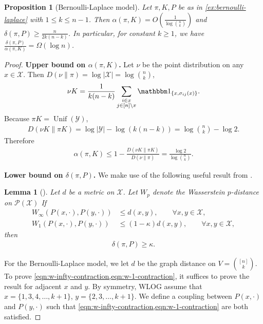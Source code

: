 \documentclass[11pt]{article}
\def\cP{\mathcal{P}}
\def\cX{\mathcal{X}}
\def\cY{\mathcal{Y}}
\DeclareMathOperator\Unif{\mathrm{Unif}}
\newtheorem{lemma}[theorem]{Lemma}
\newtheorem{proposition}[theorem]{Proposition}
\theoremstyle{definition}
\begin{document}
\begin{proposition}[Bernoulli-Laplace model] \label{prop:bernoulli-laplace}
  Let $\pi, K, P$ be as in \cref{ex:bernoulli-laplace} with $1\le k\le n-1$.
  Then $\alpha(\pi, K) = O\left(\frac 1{\log \binom nk}\right)$ and $\delta(\pi, P) \ge \frac{n}{2k(n-k)}$.
  In particular, for constant $k\ge 1$, we have $\frac{\delta(\pi, P)}{\alpha(\pi, K)} = \Omega(\log n)$.
\end{proposition}
\begin{proof}
  \textbf{Upper bound on $\alpha(\pi, K)$.}
  Let $\nu$ be the point distribution on any $x\in \cX$.
  Then $D(\nu \| \pi) = \log |\cX| = \log \binom nk$,
  \begin{align}
    \nu K =\frac 1{k(n-k)} \sum_{\substack{i\in x \\ j\in [n]\backslash x}} \mathbbm 1_{\{x,\sigma_{ij}(x)\}}.
  \end{align}
  Because $\pi K = \Unif(\cY)$,
  \begin{align}
    D(\nu K \| \pi K) = \log |\cY| - \log (k(n-k)) = \log \binom nk - \log 2.
  \end{align}
  Therefore
  \begin{align} \label{eqn:bernoulli-laplace-alpha-upper-bound}
    \alpha(\pi, K) \le 1-\frac{D(\nu K \| \pi K)}{D(\nu \| \pi)} = \frac{\log 2}{\log \binom nk}.
  \end{align}

  \textbf{Lower bound on $\delta(\pi, P)$.}
  We make use of the following useful result from \cite{caputo2024entropy}.
  \begin{lemma}[{\cite[Theorem 1]{caputo2024entropy}}] \label{lem:w-infty-plus-w-one-imply-delta-lower-bound}
    Let $d$ be a metric on $\cX$.
    Let $W_p$ denote the Wasserstein $p$-distance on $\cP(\cX)$
    If
    \begin{align}
      W_\infty(P(x,\cdot),P(y,\cdot)) &\le d(x,y), \qquad \forall x,y\in \cX, \label{eqn:w-infty-contraction}\\
      W_1(P(x,\cdot),P(y,\cdot)) &\le (1-\kappa)d(x,y), \qquad \forall x,y\in \cX, \label{eqn:w-1-contraction}
    \end{align}
    then
    \begin{align}
      \delta(\pi, P) \ge \kappa.
    \end{align}
  \end{lemma}

  For the Bernoulli-Laplace model, we let $d$ be the graph distance on $V=\binom{[n]}k$.
  To prove \cref{eqn:w-infty-contraction,eqn:w-1-contraction}, it suffices to prove the result for adjacent $x$ and $y$.
  By symmetry, WLOG assume that $x=\{1,3,4,\ldots,k+1\}$, $y=\{2,3,\ldots,k+1\}$.
  We define a coupling between $P(x,\cdot)$ and $P(y,\cdot)$ such that \cref{eqn:w-infty-contraction,eqn:w-1-contraction} are both satisfied.


\end{proof}
\end{document}
